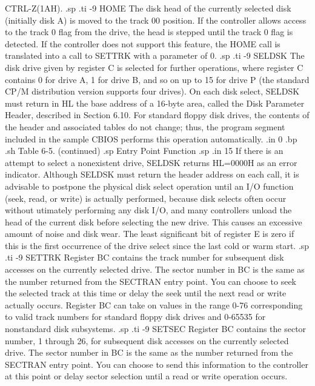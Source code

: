 CTRL-Z(1AH).
.sp
.ti -9
HOME     The disk head of the currently selected disk 
(initially disk A) is moved to the track 00 position.  If the controller 
allows access to the track 0 flag from the drive, the head is 
stepped until the track 0 flag is detected.  If the controller 
does not support this feature, the HOME 
call is translated into a call to SETTRK with a parameter of 0.
.sp
.ti -9
SELDSK   The disk drive given by register C is selected for further 
operations, where register C contains 0 for drive A, 1 for drive B, and so 
on up to 15 for drive P (the standard CP/M distribution version supports four 
drives).  On each disk select, SELDSK must return in HL the base address of a 
16-byte area, called the Disk Parameter Header, described in Section 6.10.  
For standard floppy disk drives, the contents of the header and associated 
tables do not change; thus, the program segment included in the sample CBIOS 
performs this operation automatically.  
.in 0
.bp
.sh
                     Table 6-5.  (continued)
.sp
   Entry Point                    Function
.sp
.in 15
If there is an attempt to select a 
nonexistent drive, SELDSK returns HL=0000H as an error indicator.  
Although SELDSK must return the header address on each call, it is advisable 
to postpone the physical disk select operation until an I/O function (seek, 
read, or write) is actually performed, because disk selects often occur 
without utimately performing any disk I/O, and many controllers unload 
the head of the current disk before selecting the new drive.  This 
causes an excessive amount of noise and disk wear.  The least significant bit 
of register E is zero if this is the first occurrence of the drive select 
since the last cold or warm start.
.sp
.ti -9
SETTRK   Register BC contains the track number for subsequent disk accesses 
on the currently selected drive.  The sector number in BC is the same as the 
number returned from the SECTRAN entry point.  You can choose to seek 
the selected track at this time or delay the seek until the next read or 
write actually occurs.  Register BC can take on values in the range 0-76 
corresponding to valid track numbers for standard floppy disk drives and 
0-65535 for nonstandard disk subsystems. 
.sp
.ti -9
SETSEC   Register BC contains the sector number, 1 through 26, for subsequent 
disk accesses on the currently selected drive.  The sector number in BC is 
the same as the number returned from the SECTRAN entry point.  You can 
choose to send this information to the controller at this point or delay 
sector selection until a read or write operation occurs.

